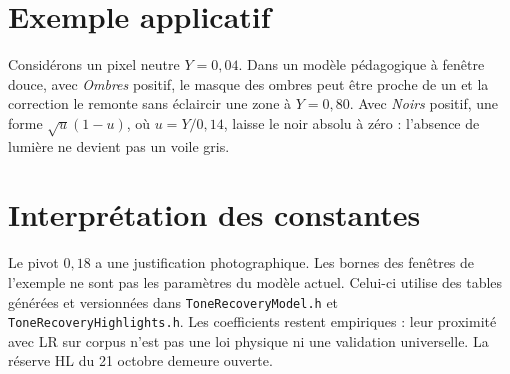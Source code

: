 \section{Exemple applicatif}
Considérons un pixel neutre $Y=0{,}04$. Dans un modèle pédagogique à fenêtre douce, avec \emph{Ombres} positif, le masque des ombres peut être proche de un et la correction le remonte sans éclaircir une zone à $Y=0{,}80$. Avec \emph{Noirs} positif, une forme $\sqrt{u}(1-u)$, où $u=Y/0{,}14$, laisse le noir absolu à zéro : l'absence de lumière ne devient pas un voile gris.

\section{Interprétation des constantes}
Le pivot $0{,}18$ a une justification photographique. Les bornes des fenêtres de l'exemple ne sont pas les paramètres du modèle actuel. Celui-ci utilise des tables générées et versionnées dans \texttt{ToneRecoveryModel.h} et \texttt{ToneRecoveryHighlights.h}. Les coefficients restent empiriques : leur proximité avec LR sur corpus n'est pas une loi physique ni une validation universelle. La réserve HL du 21 octobre demeure ouverte.



